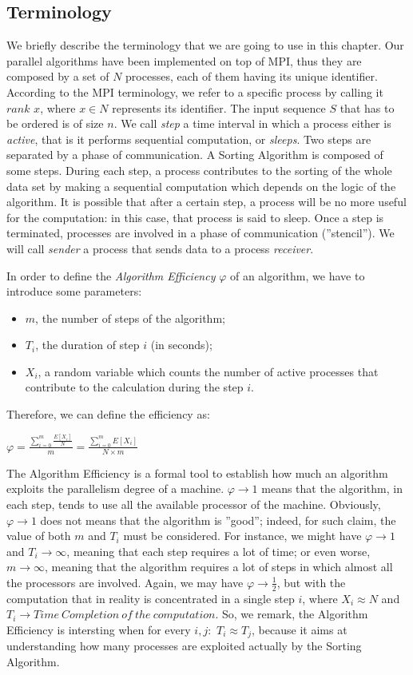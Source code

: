 \label{terminology}
\subsection*{Terminology}
We briefly describe the terminology that we are going to use in this chapter. Our parallel algorithms have been implemented on top of MPI, thus they are composed by a set of $N$ processes, each of them having its unique identifier. According to the MPI terminology, we refer to a specific process by calling it $rank$ $x$, where $x \in N$ represents its identifier. The input sequence $S$ that has to be ordered is of size $n$. We call \textit{step} a time interval in which a process either is \textit{active}, that is it performs sequential computation, or \textit{sleeps}. Two steps are separated by a phase of communication. A Sorting Algorithm is composed of some steps. During each step, a process contributes to the sorting of the whole data set by making a sequential computation which depends on the logic of the algorithm. It is possible that after a certain step, a process will be no more useful for the computation: in this case, that process is said to sleep. Once a step is terminated, processes are involved in a phase of communication (''stencil''). We will call \textit{sender} a process that sends data to a process \textit{receiver}.

In order to define the \textit{Algorithm Efficiency} $\varphi$ of an algorithm, we have to introduce some parameters:
\begin{itemize}
\item $m$, the number of steps of the algorithm;
\item $T_i$, the duration of step $i$ (in seconds);
\item $X_i$, a random variable which counts the number of active processes that contribute to the calculation during the step $i$.
\end{itemize}
Therefore, we can define the efficiency as:
\begin{center}
$\varphi = \frac{\sum_{i=0}^m \frac{E[X_i]}{N}}{m} = \frac{\sum_{i=0}^m E[X_i]}{N \times m} $
\end{center}
The Algorithm Efficiency is a formal tool to establish how much an algorithm exploits the parallelism degree of a machine. $\varphi \rightarrow 1$ means that the algorithm, in each step, tends to use all the available processor of the machine. Obviously, $\varphi \rightarrow 1$ does not means that the algorithm is ''good''; indeed, for such claim, the value of both $m$ and $T_i$ must be considered. For instance, we might have $\varphi \rightarrow 1$ and $T_i \rightarrow\infty$, meaning that each step requires a lot of time; or even worse, $m \rightarrow\infty$, meaning that the algorithm requires a lot of steps in which almost all the processors are involved. Again, we may have $\varphi \rightarrow \frac{1}{2}$, but with the computation that in reality is concentrated in a single step $i$, where $X_i \approx N$ and $T_i \rightarrow Time\ Completion\ of\ the\ computation$. So, we remark, the Algorithm Efficiency is intersting when for every $i, j:$ $T_i \approx T_j$, because it aims at understanding how many processes are exploited actually by the Sorting Algorithm.


